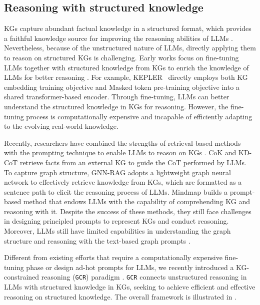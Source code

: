 {
    \newcommand{\ourmethod}{\texttt{GCR}\xspace}
\subsection{Reasoning with structured knowledge}
KGs capture abundant factual knowledge in a structured format, which provides a faithful knowledge source for improving the reasoning abilities of LLMs \cite{pan2024unifying}. Nevertheless, because of the unstructured nature of LLMs, directly applying them to reason on structured KGs is challenging. Early works focus on fine-tuning LLMs together with structured knowledge from KGs to enrich the knowledge of LLMs for better reasoning \cite{zhang2019ernie,rosset2020knowledge}. For example, KEPLER~\cite{wang2021kepler} directly employs both KG embedding training objective and Masked token pre-training objective into a shared transformer-based encoder. Through fine-tuning, LLMs can better understand the structured knowledge in KGs for reasoning. However, the fine-tuning process is computationally expensive and incapable of efficiently adapting to the evolving real-world knowledge. 

Recently, researchers have combined the strengths of retrieval-based methods with the prompting technique to enable LLMs to reason on KGs \cite{lewis2020retrieval,jiang2023unikgqa}. CoK \cite{wang2023boosting} and KD-CoT \cite{wang2023knowledge} retrieve facts from an external KG to guide the CoT performed by LLMs. To capture graph structure, GNN-RAG \cite{mavromatis2024gnn} adopts a lightweight graph neural network to effectively retrieve knowledge from KGs, which are formatted as a sentence path to elicit the reasoning process of LLMs. Mindmap \cite{wen2023mindmap} builds a prompt-based method that endows LLMs with the capability of comprehending KG and reasoning with it. Despite the success of these methods, they still face challenges in designing principled prompts to represent KGs and conduct reasoning. Moreover, LLMs still have limited capabilities in understanding the graph structure and reasoning with the text-based graph prompts \cite{huang2024can}. 

Different from existing efforts that require a computationally expensive fine-tuning phase or design ad-hot prompts for LLMs,  we recently introduced a KG-constrained reasoning (\ourmethod) paradigm \cite{luo2024graph}. \ourmethod connects unstructured reasoning in LLMs with structured knowledge in KGs, seeking to achieve efficient and effective reasoning on structured knowledge. The overall framework is illustrated in .

}
